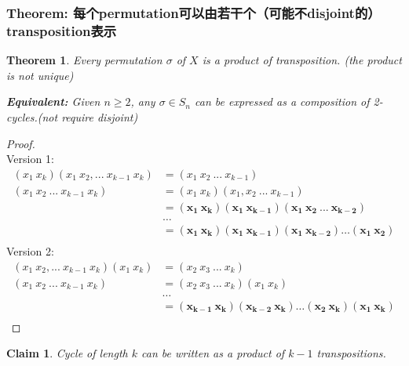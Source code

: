 \documentclass[11pt,a4paper]{article}
\newtheorem{theorem}{Theorem}
\newtheorem{claim}{Claim}
\begin{document}
\subsubsection{Theorem: 每个permutation可以由若干个（可能不disjoint的）transposition表示}
\begin{theorem}
    Every permutation $\sigma$ of $X$ is a product of transposition. (the product is not unique)

    \textbf{Equivalent:} Given $n\geq2$, any $\sigma \in S_n$ can be expressed as a composition of 2-cycles.(not require disjoint)
\end{theorem}
\begin{proof}
    \quad\\

    Version 1:
    \begin{equation}
        \begin{aligned}
            (x_1\ x_{k})(x_1\ x_2,...\ x_{k-1}\ x_{k})&=(x_1\ x_2\ ...\ x_{k-1})\\
            (x_1\ x_2\ ...\ x_{k-1}\ x_{k})&=(x_1\ x_{k})(x_1,x_2\ ...\ x_{k-1})\\
            &=\mathbf{(x_1\ x_{k})(x_1\ x_{k-1})(x_1\ x_2\ ...\ x_{k-2})}\\
            &\dots\\
            &=\mathbf{(x_1\ x_{k})(x_1\ x_{k-1})(x_1\ x_{k-2})\dots(x_1\ x_2)}\\
        \end{aligned}
        \nonumber
    \end{equation}
    Version 2:
    \begin{equation}
        \begin{aligned}
            (x_1\ x_2,...\ x_{k-1}\ x_{k})(x_1\ x_{k})&=(x_2\ x_3\ ...\ x_{k})\\
            (x_1\ x_2\ ...\ x_{k-1}\ x_{k})&=(x_2\ x_3\ ...\ x_{k})(x_1\ x_{k})\\
            &\dots\\
            &=\mathbf{(x_{k-1}\ x_{k})(x_{k-2}\ x_{k})\dots(x_2\ x_{k})(x_1\ x_k)}\\
        \end{aligned}
        \nonumber
    \end{equation}
\end{proof}

\begin{claim}
Cycle of length $k$ can be written as a product of $k-1$ transpositions.
\end{claim}
\end{document}
